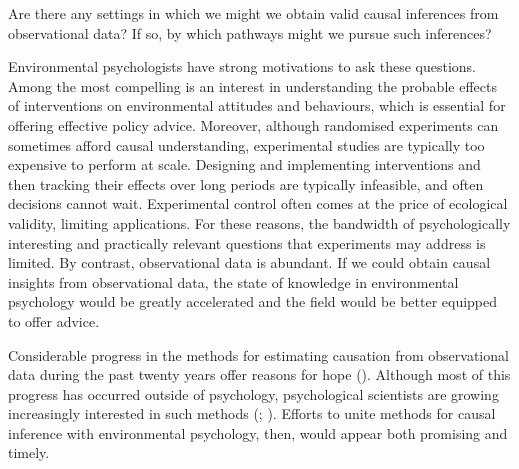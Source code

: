 \documentclass[
  singlecolumn]{article}
\begin{document}
Are there any settings in which we might we obtain valid causal
inferences from observational data? If so, by which pathways might we
pursue such inferences?

Environmental psychologists have strong motivations to ask these
questions. Among the most compelling is an interest in understanding the
probable effects of interventions on environmental attitudes and
behaviours, which is essential for offering effective policy advice.
Moreover, although randomised experiments can sometimes afford causal
understanding, experimental studies are typically too expensive to
perform at scale. Designing and implementing interventions and then
tracking their effects over long periods are typically infeasible, and
often decisions cannot wait. Experimental control often comes at the
price of ecological validity, limiting applications. For these reasons,
the bandwidth of psychologically interesting and practically relevant
questions that experiments may address is limited. By contrast,
observational data is abundant. If we could obtain causal insights from
observational data, the state of knowledge in environmental psychology
would be greatly accelerated and the field would be better equipped to
offer advice.

Considerable progress in the methods for estimating causation from
observational data during the past twenty years offer reasons for hope
(). Although most of
this progress has occurred outside of psychology, psychological
scientists are growing increasingly interested in such methods
(;
). Efforts to unite methods for
causal inference with environmental psychology, then, would appear both
promising and timely.
\end{document}
